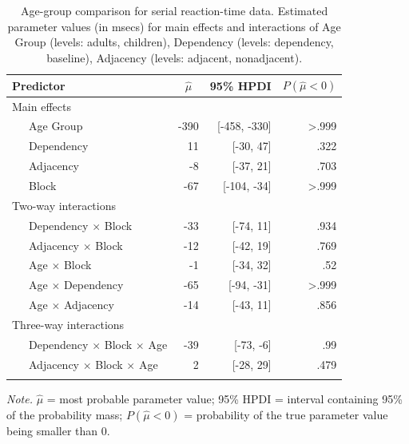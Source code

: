 \documentclass[
  english,
  man,floatsintext]{apa7}
\begin{document}
\begin{table}[ht]

\begin{center}
\begin{threeparttable}

\caption{\label{tab:tablemodel}Age-group comparison for serial reaction-time data. Estimated parameter values (in msecs) for main effects and interactions of Age Group (levels: adults, children), Dependency (levels: dependency, baseline), Adjacency (levels: adjacent, nonadjacent).}

\footnotesize{

\begin{tabular}{lrrr}
\toprule
Predictor & \multicolumn{1}{c}{$\hat{\mu}$} & \multicolumn{1}{c}{95\% HPDI} & \multicolumn{1}{c}{$P(\hat{\mu}<0)$}\\
\midrule
Main effects &  &  & \\
\ \ \ Age Group & -390 & [-458, -330] & >.999\\
\ \ \ Dependency & 11 & [-30, 47] & .322\\
\ \ \ Adjacency & -8 & [-37, 21] & .703\\
\ \ \ Block & -67 & [-104, -34] & >.999\\
Two-way interactions &  &  & \\
\ \ \ Dependency $\times$ Block & -33 & [-74, 11] & .934\\
\ \ \ Adjacency $\times$ Block & -12 & [-42, 19] & .769\\
\ \ \ Age $\times$ Block & -1 & [-34, 32] & .52\\
\ \ \ Age $\times$ Dependency & -65 & [-94, -31] & >.999\\
\ \ \ Age $\times$ Adjacency & -14 & [-43, 11] & .856\\
Three-way interactions &  &  & \\
\ \ \ Dependency $\times$ Block $\times$ Age & -39 & [-73, -6] & .99\\
\ \ \ Adjacency $\times$ Block $\times$ Age & 2 & [-28, 29] & .479\\
\bottomrule
\addlinespace
\end{tabular}

}

\begin{tablenotes}[para]
\normalsize{\textit{Note.} $\hat{\mu}$ = most probable parameter value; 95\% HPDI = interval containing 95\% of the probability mass; $P(\hat{\mu}<0)$ = probability of the true parameter value being smaller than 0.}
\end{tablenotes}

\end{threeparttable}
\end{center}

\end{table}
\end{document}
